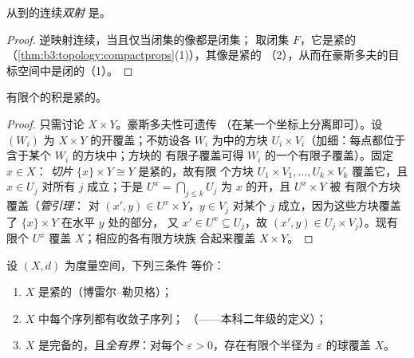 \begin{corollary}\label{cor:b3:topology:compacthomeo}
从到的连续\emph{双射}
是。
\end{corollary}

\begin{proof}
逆映射连续，当且仅当闭集的像都是闭集；
取闭集 $F$，它是紧的
（\cref{thm:b3:topology:compactprops}(1)），其像是紧的
（2），从而在豪斯多夫的目标空间中是闭的（1）。
\end{proof}

\begin{theorem}[有限积]\label{thm:b3:topology:tychonoff}
有限个的积是紧的。
\end{theorem}

\begin{proof}
只需讨论 $X \times Y$。豪斯多夫性可遗传
（在某一个坐标上分离即可）。设 $(W_i)$ 为 $X
\times Y$ 的开覆盖；不妨设各 $W_i$ 为中的方块 $U_i \times
V_i$（加细：每点都位于含于某个 $W_i$ 的方块中；方块的
有限子覆盖可得 $W_i$ 的一个有限子覆盖）。固定 $x \in X$：
\emph{切片} $\{x\}\times Y \cong Y$ 是紧的，故有限
个方块 $U_1\times V_1, \dots, U_k\times V_k$ 覆盖它，且
$x \in U_j$ 对所有 $j$ 成立；于是 $U^x = \bigcap_{j \leq k} U_j$ 为
$x$ 的开，且 $U^x \times Y$ 被
有限个方块覆盖（\emph{管引理}：
对 $(x', y) \in U^x \times Y$，$y \in V_j$
对某个 $j$ 成立，因为这些方块覆盖了 $\{x\}\times Y$ 在水平 $y$ 处的部分，
又 $x' \in U^x \subseteq U_j$，故 $(x', y) \in U_j
\times V_j$）。现有限个 $U^x$
覆盖 $X$；相应的各有限方块族
合起来覆盖 $X \times Y$。
\end{proof}

\begin{theorem}[度量空间中的紧性]
\label{thm:b3:topology:metriccompact}
设 $(X, d)$ 为度量空间，下列三条件
等价：
\begin{enumerate}
  \item $X$ 是紧的（博雷尔–勒贝格）；
  \item $X$ 中每个序列都有收敛子序列；
        （——本科二年级的定义）；
  \item $X$ 是完备的，且\emph{全有界}：对每个
        $\varepsilon > 0$，存在有限个半径为
        $\varepsilon$ 的球覆盖 $X$。
\end{enumerate}
\end{theorem}

